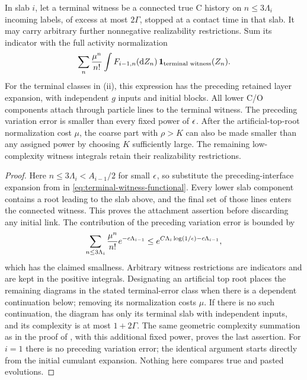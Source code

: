 \begin{corollary}\label{cor:terminal-witness}
In slab $i$, let a terminal witness be a connected true C history on
$n\le3\Lambda_i$ incoming labels, of excess at most $2\Gamma$, stopped
at a contact time in that slab.  It may carry arbitrary further
nonnegative realizability restrictions.  Sum its indicator with the
full activity normalization
\begin{equation}\label{eq:terminal-witness-functional}
 \sum_n\frac{\mu^n}{n!}
       \int F_{i-1,n}(\mathrm d Z_n)\,
                       \mathbf 1_{\text{terminal witness}}(Z_n).
\end{equation}
For the terminal classes in (ii), this
expression has the preceding retained
layer expansion, with independent $g$ inputs and initial blocks.
All lower C/O components attach through particle lines to the
terminal witness.  The preceding variation error is smaller than every
fixed power of $\epsilon$.  After the artificial-top-root normalization
cost $\mu$, the coarse part with $\rho>K$ can also be made smaller than
any assigned power by choosing $K$ sufficiently large.  The remaining
low-complexity witness integrals retain their realizability restrictions.
\end{corollary}

\begin{proof}
Here $n\le3\Lambda_i<A_{i-1}/2$ for small $\epsilon$, so substitute the
preceding-interface expansion from
 in \eqref{eq:terminal-witness-functional}.
Every lower slab component contains a root leading to the slab above,
and the final set of those lines enters the connected witness.  This
proves the attachment assertion before discarding any initial link.
The contribution of the preceding variation error is bounded by
\[
 \sum_{n\le3\Lambda_i}\frac{\mu^n}{n!}
       e^{-c\Lambda_{i-1}}
 \le e^{C\Lambda_i\log(1/\epsilon)-c\Lambda_{i-1}},
\]
which has the claimed smallness.  Arbitrary witness restrictions are
indicators and are kept in the positive integrals.  Designating an
artificial top root places the remaining diagrams in the stated
terminal-error class when there is a dependent continuation below;
removing its normalization costs $\mu$.  If there is no such
continuation, the diagram has only its terminal slab with independent
inputs, and its complexity is at most $1+2\Gamma$.  The same geometric
complexity summation as in the proof of
, with this additional fixed power, proves
the last assertion.  For $i=1$ there is no preceding variation error;
the identical argument starts directly from the initial cumulant
expansion.  Nothing here compares true and pasted evolutions.
\end{proof}
